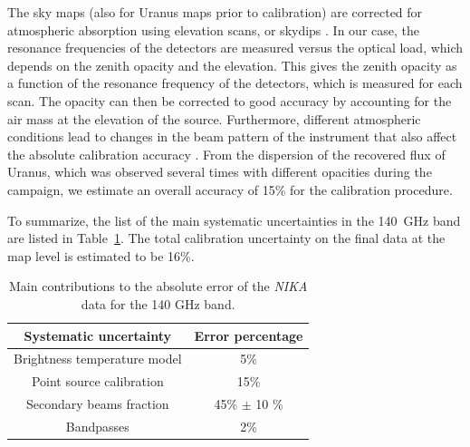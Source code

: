 The sky maps (also for Uranus maps prior to calibration) are corrected for atmospheric absorption using elevation scans, or skydips \citep[see][for further details]{main_run5}. In our case, the resonance frequencies of the detectors are measured versus the optical load, which depends on the zenith opacity and the elevation. This gives the zenith opacity as a function of the resonance frequency of the detectors, which is measured for each scan. The opacity can then be corrected to good accuracy by accounting for the air mass at the elevation of the source. Furthermore, different atmospheric conditions lead to changes in the beam pattern of the instrument that also affect the absolute calibration accuracy \citep{main_run5}. From the dispersion of the recovered flux of Uranus, which was observed several times with different opacities during the campaign, we estimate an overall accuracy of 15\% \citep{main_run5} for the calibration procedure.

To summarize, the list of the main systematic uncertainties in the 140~GHz band are listed in Table~\ref{tab:table_err}. The total calibration uncertainty on the final data at the map level is estimated to be 16\%.
\begin{table}
\begin{center}
\begin{tabular}{cc}
\hline
\hline
Systematic uncertainty & Error percentage \\
\hline
Brightness temperature model & 5\% \\
Point source calibration & 15\% \\
Secondary beams fraction & 45\% $\pm$ 10 \% \\
Bandpasses & 2\% \\
\hline
\end{tabular}
\end{center}
\caption{Main contributions to the absolute error of the {\it NIKA} data for the 140 GHz band.}
\label{tab:table_err}
\end{table}
